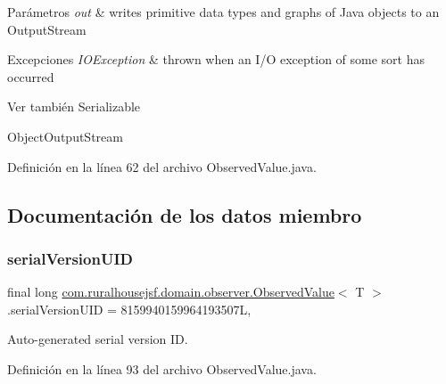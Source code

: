 \begin{DoxyParams}{Parámetros}
{\em out} & writes primitive data types and graphs of Java objects to an Output\+Stream \\
\hline
\end{DoxyParams}

\begin{DoxyExceptions}{Excepciones}
{\em I\+O\+Exception} & thrown when an I/O exception of some sort has occurred \\
\hline
\end{DoxyExceptions}
\begin{DoxySeeAlso}{Ver también}
Serializable 

Object\+Output\+Stream 
\end{DoxySeeAlso}


Definición en la línea 62 del archivo Observed\+Value.\+java.



\subsection{Documentación de los datos miembro}
\mbox{\label{classcom_1_1ruralhousejsf_1_1domain_1_1observer_1_1_observed_value_a01052aac89cda6c5f230343d40b54e89}} 
\subsubsection{\texorpdfstring{serialVersionUID}{serialVersionUID}}
{\footnotesize\ttfamily final long \mbox{\hyperlink{classcom_1_1ruralhousejsf_1_1domain_1_1observer_1_1_observed_value}{com.\+ruralhousejsf.\+domain.\+observer.\+Observed\+Value}}$<$ T $>$.serial\+Version\+U\+ID = 8159940159964193507L\hspace{0.3cm}{\ttfamily [static]}, {\ttfamily [private]}}



Auto-\/generated serial version ID. 



Definición en la línea 93 del archivo Observed\+Value.\+java.

\mbox{\label{classcom_1_1ruralhousejsf_1_1domain_1_1observer_1_1_observed_value_a7f337dfd21158b7642243b5fd1fcb877}} 
